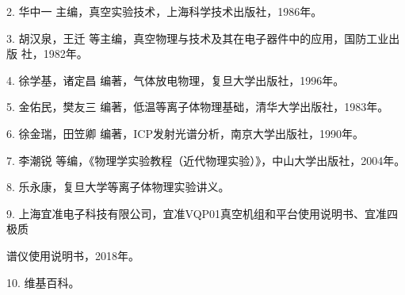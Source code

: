 \documentclass[dvipsnames, svgnames,a4paper,11pt]{article}
\begin{document}
2. 华中一 主编，真空实验技术，上海科学技术出版社，1986年。

3. 胡汉泉，王迁 等主编，真空物理与技术及其在电子器件中的应用，国防工业出版
社，1982年。

4. 徐学基，诸定昌 编著，气体放电物理，复旦大学出版社，1996年。

5. 金佑民，樊友三 编著，低温等离子体物理基础，清华大学出版社，1983年。

6. 徐金瑞，田笠卿 编著，ICP发射光谱分析，南京大学出版社，1990年。

7. 李潮锐 等编，《物理学实验教程（近代物理实验）》，中山大学出版社，2004年。

8. 乐永康，复旦大学等离子体物理实验讲义。

9. 上海宜准电子科技有限公司，宜准VQP01真空机组和平台使用说明书、宜准四极质

谱仪使用说明书，2018年。

10. 维基百科。




\end{document}
